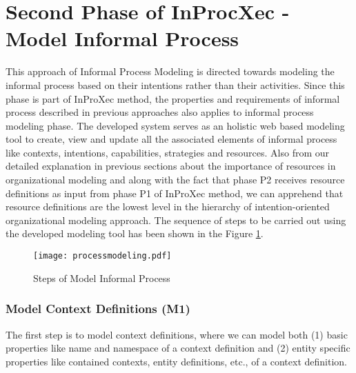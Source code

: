 \section{Second Phase of InProcXec - Model Informal Process}
\label{sec:informalprocessmodeling}
This approach of Informal Process Modeling is directed towards modeling the informal process based on their intentions rather than their activities.  Since this phase is part of InProXec method, the properties and requirements of informal process described in previous approaches \cite{Sungur2014a,Sungur2015} also applies to informal process modeling phase. The developed system serves as an holistic web based modeling tool to create, view and update all the associated elements of informal process like contexts, intentions, capabilities, strategies and resources. Also from our detailed explanation in previous sections about the importance of resources in organizational modeling and along with the fact that phase P2 receives resource definitions as input from phase P1 of InProXec method, we can apprehend that resource definitions are the lowest level in the hierarchy of intention-oriented organizational modeling approach. The sequence of steps to be carried out using the developed modeling tool has been shown in the Figure \ref{fig:processdiagram}. 

\begin{figure}
	\centering
	\texttt{[image: processmodeling.pdf]}
	\caption{Steps of Model Informal Process}
	\label{fig:processdiagram}
\end{figure}

\subsubsection{Model Context Definitions (M1)}  
The first step is to model context definitions, where we can model both (1) basic properties like name and namespace of a context definition and (2) entity specific properties like contained contexts, entity definitions, etc., of a context definition.  

